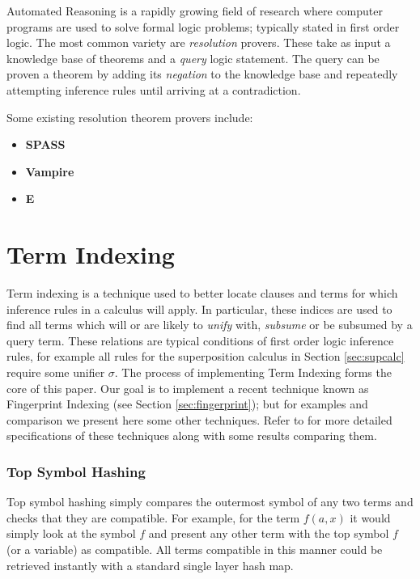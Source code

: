 Automated Reasoning is a rapidly growing field of research where computer programs
are used to solve formal logic problems; typically stated in first order logic.
The most common variety are \emph{resolution} provers. These take as input a knowledge
base of theorems and a \emph{query} logic statement. The query can be proven a theorem
by adding its \emph{negation} to the knowledge base and repeatedly attempting inference rules
until arriving at a contradiction.

Some existing resolution theorem provers include:

\begin{itemize}
\item \textbf{SPASS}
\cite{spass}
\item \textbf{Vampire}
\cite{vampire}
\item \textbf{E}
\cite{eprover}

\end{itemize}

\section{Term Indexing}
\label{sec:indexing}

Term indexing is a technique used to better locate clauses and terms for which inference rules
in a calculus will apply. In particular, these indices are used to find all terms which
will or are likely to \emph{unify} with, \emph{subsume} or be subsumed by a query term. These relations are typical conditions
of first order logic inference rules, for example all rules for the superposition calculus
in Section \ref{sec:supcalc} require some unifier $\sigma$.
The process of implementing Term Indexing forms the core of this paper. Our goal
is to implement a recent technique known as Fingerprint Indexing (see Section \ref{sec:fingerprint});
but for examples and comparison we present here some other techniques.
Refer to \cite{indexing} for more detailed specifications of these techniques along
with some results comparing them.

\subsubsection{Top Symbol Hashing}
Top symbol hashing simply compares the outermost symbol of any two terms and checks
that they are compatible. For example, for the term $f(a,x)$ it would simply look
at the symbol $f$ and present any other term with the top symbol $f$ (or a variable) as compatible.
All terms compatible in this manner could be retrieved instantly with a standard
single layer hash map.

